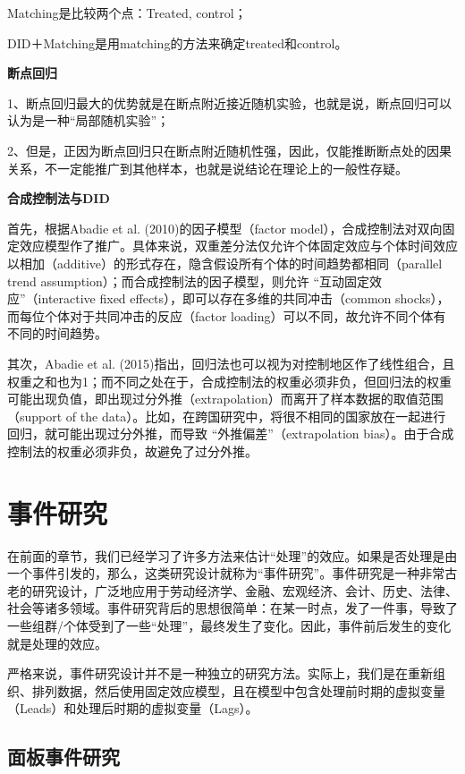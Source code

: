 \documentclass[cn,12pt,math=newtx,citestyle=gb7714-2015,bibstyle=gb7714-2015]{elegantbook}
\begin{document}
	Matching是比较两个点：Treated, control；
	
	DID＋Matching是用matching的方法来确定treated和control。
	
	
	\textbf{断点回归}
	
	1、断点回归最大的优势就是在断点附近接近随机实验，也就是说，断点回归可以认为是一种“局部随机实验”；
	
	2、但是，正因为断点回归只在断点附近随机性强，因此，仅能推断断点处的因果关系，不一定能推广到其他样本，也就是说结论在理论上的一般性存疑。
	
	
	\textbf{合成控制法与DID}
	
	首先，根据Abadie et al. (2010)的因子模型（factor model），合成控制法对双向固定效应模型作了推广。具体来说，双重差分法仅允许个体固定效应与个体时间效应以相加（additive）的形式存在，隐含假设所有个体的时间趋势都相同（parallel trend assumption）；而合成控制法的因子模型，则允许 “互动固定效应”（interactive fixed effects），即可以存在多维的共同冲击（common shocks），而每位个体对于共同冲击的反应（factor loading）可以不同，故允许不同个体有不同的时间趋势。
	
	其次，Abadie et al. (2015)指出，回归法也可以视为对控制地区作了线性组合，且权重之和也为1；而不同之处在于，合成控制法的权重必须非负，但回归法的权重可能出现负值，即出现过分外推（extrapolation）而离开了样本数据的取值范围（support of the data）。比如，在跨国研究中，将很不相同的国家放在一起进行回归，就可能出现过分外推，而导致 “外推偏差”（extrapolation bias）。由于合成控制法的权重必须非负，故避免了过分外推。
	
	\chapter{事件研究}
	
	在前面的章节，我们已经学习了许多方法来估计“处理”的效应。如果是否处理是由一个事件引发的，那么，这类研究设计就称为“事件研究”。事件研究是一种非常古老的研究设计，广泛地应用于劳动经济学、金融、宏观经济、会计、历史、法律、社会等诸多领域。事件研究背后的思想很简单：在某一时点，发了一件事，导致了一些组群/个体受到了一些“处理”，最终发生了变化。因此，事件前后发生的变化就是处理的效应。
	
	严格来说，事件研究设计并不是一种独立的研究方法。实际上，我们是在重新组织、排列数据，然后使用固定效应模型，且在模型中包含处理前时期的虚拟变量（Leads）和处理后时期的虚拟变量（Lags）。
	
	\section{面板事件研究}
	
\end{document}
